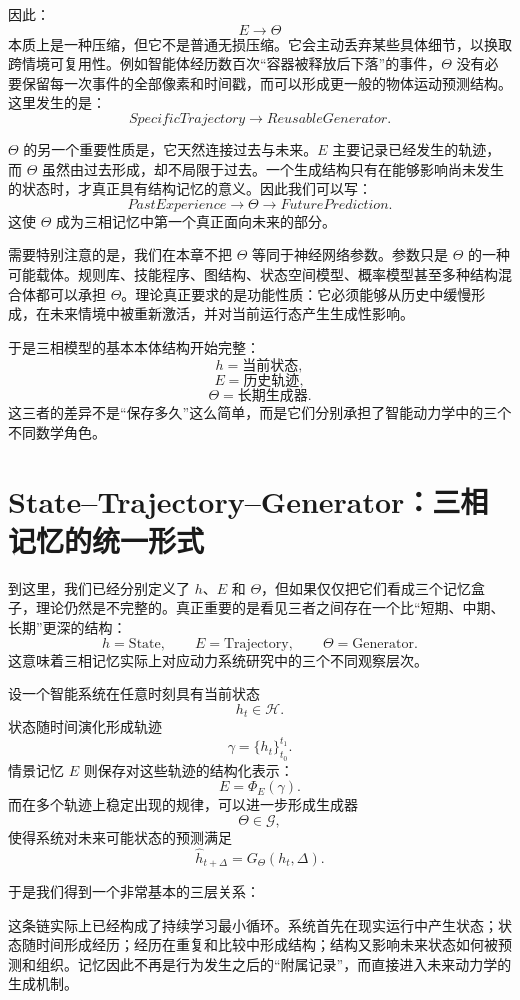 因此：
\[
E
\rightarrow
\Theta
\]
本质上是一种压缩，但它不是普通无损压缩。它会主动丢弃某些具体细节，以换取跨情境可复用性。例如智能体经历数百次“容器被释放后下落”的事件，$\Theta$ 没有必要保留每一次事件的全部像素和时间戳，而可以形成更一般的物体运动预测结构。这里发生的是：
\[
SpecificTrajectory
\rightarrow
ReusableGenerator.
\]

$\Theta$ 的另一个重要性质是，它天然连接过去与未来。$E$ 主要记录已经发生的轨迹，而 $\Theta$ 虽然由过去形成，却不局限于过去。一个生成结构只有在能够影响尚未发生的状态时，才真正具有结构记忆的意义。因此我们可以写：
\[
PastExperience
\rightarrow
\Theta
\rightarrow
FuturePrediction.
\]
这使 $\Theta$ 成为三相记忆中第一个真正面向未来的部分。

需要特别注意的是，我们在本章不把 $\Theta$ 等同于神经网络参数。参数只是 $\Theta$ 的一种可能载体。规则库、技能程序、图结构、状态空间模型、概率模型甚至多种结构混合体都可以承担 $\Theta$。理论真正要求的是功能性质：它必须能够从历史中缓慢形成，在未来情境中被重新激活，并对当前运行态产生生成性影响。

于是三相模型的基本本体结构开始完整：
\[
h=\text{当前状态},
\]
\[
E=\text{历史轨迹},
\]
\[
\Theta=\text{长期生成器}.
\]
这三者的差异不是“保存多久”这么简单，而是它们分别承担了智能动力学中的三个不同数学角色。

\section{State--Trajectory--Generator：三相记忆的统一形式}

到这里，我们已经分别定义了 $h$、$E$ 和 $\Theta$，但如果仅仅把它们看成三个记忆盒子，理论仍然是不完整的。真正重要的是看见三者之间存在一个比“短期、中期、长期”更深的结构：
\[
\boxed{
h=\mathrm{State},
\qquad
E=\mathrm{Trajectory},
\qquad
\Theta=\mathrm{Generator}.
}
\]
这意味着三相记忆实际上对应动力系统研究中的三个不同观察层次。

设一个智能系统在任意时刻具有当前状态
\[
h_t\in\mathcal{H}.
\]
状态随时间演化形成轨迹
\[
\gamma
=
\{h_t\}_{t_0}^{t_1}.
\]
情景记忆 $E$ 则保存对这些轨迹的结构化表示：
\[
E
=
\Phi_E(\gamma).
\]
而在多个轨迹上稳定出现的规律，可以进一步形成生成器
\[
\Theta
\in
\mathcal{G},
\]
使得系统对未来可能状态的预测满足
\[
\hat h_{t+\Delta}
=
G_\Theta(h_t,\Delta).
\]

于是我们得到一个非常基本的三层关系：
\begin{statementbox}
\centering
{}
\end{statementbox}
这条链实际上已经构成了持续学习最小循环。系统首先在现实运行中产生状态；状态随时间形成经历；经历在重复和比较中形成结构；结构又影响未来状态如何被预测和组织。记忆因此不再是行为发生之后的“附属记录”，而直接进入未来动力学的生成机制。

